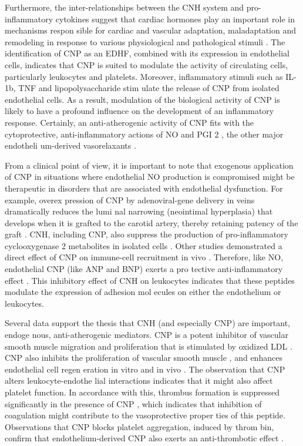 \documentclass[14pt,a4paper,onecolumn]{extarticle}
\begin{document}
Furthermore, the inter-relationships between the CNH system and pro-inflammatory cytokines suggest that cardiac hormones play an important role in mechanisms respon sible for cardiac and vascular adaptation, maladaptation and remodeling in response to various physiological and pathological stimuli \citep{32} \citep{35} \citep{62} \citep{162}. The identification of CNP as an EDHF, combined with its expression in endothelial cells, indicates that CNP is suited to modulate the activity of circulating cells, particularly leukocytes and platelets.  Moreover, inflammatory stimuli such as IL-1b, TNF and lipopolysaccharide \citep{280} stim ulate the release of CNP from isolated endothelial cells. As a result, modulation of the biological activity of CNP is likely to have a profound influence on the development of an inflammatory response. Certainly, an anti-atherogenic activity of CNP fits with the cytoprotective, anti-inflammatory actions of NO and PGI 2 , the other major endotheli um-derived vasorelaxants \citep{267} \citep{269} \citep{270} \citep{271} \citep{280}.

From a clinical point of view, it is important to note that exogenous application of CNP in situations where endothelial NO production is compromised might be therapeutic in disorders that are associated with endothelial dysfunction. For example, overex pression of CNP by adenoviral-gene delivery in veins dramatically reduces the lumi nal narrowing (neointimal hyperplasia) that develops when it is grafted to the carotid artery, thereby retaining patency of the graft \citep{281}. CNH, including CNP, also suppress the production of pro-inflammatory cyclooxygenase 2 metabolites in isolated cells \citep{106} \citep{282}. Other studies demonstrated a direct effect of CNP on immune-cell recruitment in vivo \citep{267} \citep{271}. Therefore, like NO, endothelial CNP (like ANP and BNP) exerts a pro tective anti-inflammatory effect \citep{104} \citep{105} \citep{106} \citep{267} \citep{271} \citep{283}. This inhibitory effect of CNH on leukocytes indicates that these peptides modulate the expression of adhesion mol ecules on either the endothelium or leukocytes.

Several data support the thesis that CNH (and especially CNP) are important, endoge nous, anti-atherogenic mediators. CNP is a potent inhibitor of vascular smooth muscle migration and proliferation that is stimulated by oxidized LDL \citep{277}. CNP also inhibits the proliferation of vascular smooth muscle \citep{284}, and enhances endothelial cell regen eration in vitro and in vivo \citep{281}. The observation that CNP alters leukocyte-endothe lial interactions indicates that it might also affect platelet function. In accordance with this, thrombus formation is suppressed significantly in the presence of CNP \citep{280}, which indicates that inhibition of coagulation might contribute to the vasoprotective proper ties of this peptide. Observations that CNP blocks platelet aggregation, induced by throm bin, confirm that endothelium-derived CNP also exerts an anti-thrombotic effect \citep{267}.
\end{document}

